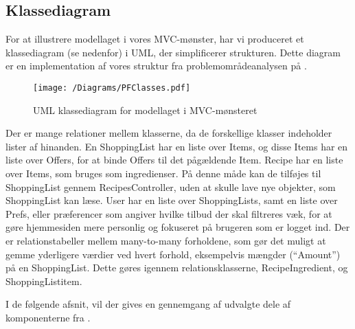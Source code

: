 \subsection{Klassediagram}
For at illustrere modellaget i vores MVC-mønster, har vi produceret et klassediagram (se  nedenfor) i UML, der simplificerer strukturen. 
Dette diagram er en implementation af vores struktur fra problemområdeanalysen på .

\begin{figure}[h]
\centering
 \texttt{[image: /Diagrams/PFClasses.pdf]}
\caption{UML klassediagram for modellaget i MVC-mønsteret}\label{diagram:klassediagram}
\end{figure}

Der er mange relationer mellem klasserne, da de forskellige klasser indeholder lister af hinanden.
En ShoppingList har en liste over Items, og disse Items har en liste over Offers, for at binde Offers til det pågældende Item.
Recipe har en liste over Items, som bruges som ingredienser.
På denne måde kan de tilføjes til ShoppingList gennem RecipesController, uden at skulle lave nye objekter, som ShoppingList kan læse.
User har en liste over ShoppingLists, samt en liste over Prefs, eller præferencer som angiver hvilke tilbud der skal filtreres væk, for at gøre hjemmesiden mere personlig og fokuseret på brugeren som er logget ind.
Der er relationstabeller mellem many-to-many forholdene, som gør det muligt at gemme yderligere værdier ved hvert forhold, eksempelvis mængder (``Amount'') på en ShoppingList.
Dette gøres igennem relationsklasserne, Recipe\textunderscore Ingredient, og ShoppingList\textunderscore item.

I de følgende afsnit, vil der gives en gennemgang af udvalgte dele af komponenterne fra .
